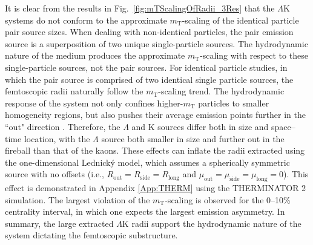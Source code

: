 \documentclass[ALICE,manyauthors]{cernphprep}
\newcommand{\mt}{$m_{\mathrm{T}}$\xspace}
\newcommand{\Lam}{$\Lambda$\xspace}
\newcommand{\LamK}{$\Lambda$K\xspace}
\begin{document}
It is clear from the results in Fig.\ \ref{fig:mTScalingOfRadii_3Res} that the \LamK systems do not conform to the approximate \mt-scaling of the identical particle pair source sizes.
When dealing with non-identical particles, the pair emission source is a superposition of two unique single-particle sources.
The hydrodynamic nature of the medium produces the approximate \mt-scaling with respect to these single-particle sources, not the pair sources.
For identical particle studies, in which the pair source is comprised of two identical single particle sources, the femtoscopic radii naturally follow the \mt-scaling trend.
The hydrodynamic response of the system not only confines higher-\mt particles to smaller homogeneity regions, but also pushes their average emission points further in the ``out" direction \cite{Retiere:2003kf}.
Therefore, the \Lam and K sources differ both in size and space--time location, with the \Lam source both smaller in size and further out in the fireball than that of the kaons.
These effects can inflate the radii extracted using the one-dimensional Lednick\'y model, which assumes a spherically symmetric source with no offsets (i.e., $R_{\mathrm{out}} = R_{\mathrm{side}} = R_{\mathrm{long}}$ and $\mu_{\mathrm{out}} = \mu_{\mathrm{side}} = \mu_{\mathrm{long}} = 0$).
This effect is demonstrated in Appendix \ref{App:THERM} using the THERMINATOR 2 simulation.
The largest violation of the \mt-scaling is observed for the 0--10\% centrality interval, in which one expects the largest emission asymmetry.
In summary, the large extracted \LamK radii support the hydrodynamic nature of the system dictating the femtoscopic substructure.
\end{document}
